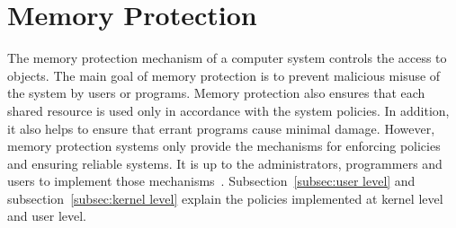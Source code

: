 \section{Memory Protection}
The memory protection mechanism of a computer system controls the access to objects. The main goal of memory protection is to prevent malicious misuse of the system by users or programs. Memory protection also ensures that each shared resource is used only in accordance with the system policies. In addition, it also helps to ensure that errant programs cause minimal damage. However, memory protection systems only provide the mechanisms for enforcing policies and ensuring reliable systems. It is up to the administrators, programmers and users to implement those mechanisms~\cite{Galvin, Graham:1971:PPP:1478873.1478928}. Subsection~\ref{subsec:user level} and subsection~\ref{subsec:kernel level} explain the policies implemented at kernel level and user level. 


